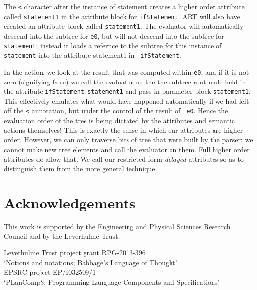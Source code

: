 The \verb+<+ character after the instance of statement creates a
higher order attribute called {\tt statement1} in the attribute block
for {\tt ifStatement}. ART will also have created an attribute block
called {\tt statement1}. The evaluator will automatically descend into
the subtree for {\tt e0}, but will not descend into the subtree for
{\tt statement}: instead it loads a refernce to the subtree for this
instance of {\tt statement} into the attribute statement1 in {\tt
  ifStatement}.

In the action, we look at the result that was computed within {\tt e0}, and
if it is not zero (signifying false) we call the evaluator on the the
subtree root node held in the attribute {\tt ifStatement.statement1}
and pass in parameter block {\tt statement1}. This effectively
emulates what would have happened automatically if we had left off the
{\tt <} annotation, but under the control of the result of {\tt
  e0}. Hence the evaluation order of the tree is being dictated by the
attributes and semantic actions themselves! This is exactly the sense
in which our attributes are higher order. However, we can only
traverse bits of tree that were built by the parser: we cannot make
new tree elements and call the evaluator on them. Full higher order
attributes do allow that. We call our restricted form {\em delayed}
attributes so as to distinguish them from the more general technique.

\chapter{Acknowledgements}
{\Large\sf
\noindent This work is supported by the Engineering and Physical Sciences Research Council and by the Leverhulme Trust.\\[3ex]

\pagestyle{empty}

\noindent Leverhulme Trust project grant RPG-2013-396\\  `Notions and notations; Babbage's Language of Thought'\\[3ex]

\noindent EPSRC project EP/I032509/1\\  `PLanCompS: Programming Language Components and Specifications'
}